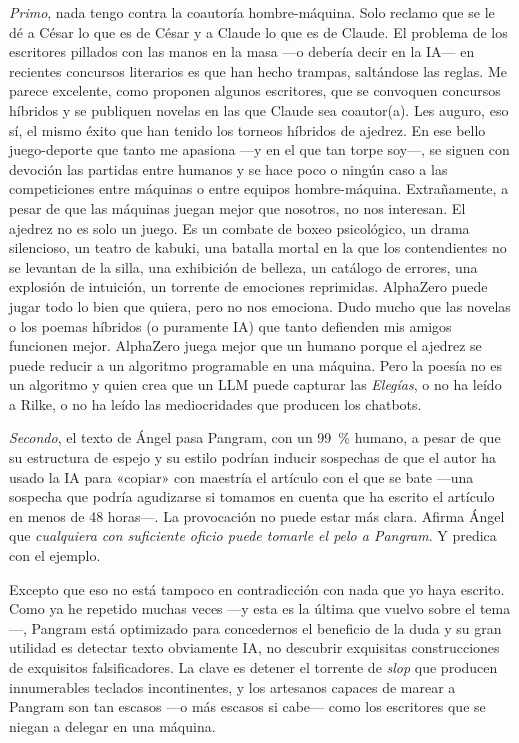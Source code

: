 \documentclass[11pt,a4paper]{article}
\begin{document}
\emph{Primo}, nada tengo contra la coautoría hombre-máquina. Solo reclamo que se le dé a César lo que es de César y a Claude lo que es de Claude. El problema de los escritores pillados con las manos en la masa ---o debería decir en la IA--- en recientes concursos literarios es que han hecho trampas, saltándose las reglas. Me parece excelente, como proponen algunos escritores, que se convoquen concursos híbridos y se publiquen novelas en las que Claude sea coautor(a). Les auguro, eso sí, el mismo éxito que han tenido los torneos híbridos de ajedrez. En ese bello juego-deporte que tanto me apasiona ---y en el que tan torpe soy---, se siguen con devoción las partidas entre humanos y se hace poco o ningún caso a las competiciones entre máquinas o entre equipos hombre-máquina. Extrañamente, a pesar de que las máquinas juegan mejor que nosotros, no nos interesan. El ajedrez no es solo un juego. Es un combate de boxeo psicológico, un drama silencioso, un teatro de kabuki, una batalla mortal en la que los contendientes no se levantan de la silla, una exhibición de belleza, un catálogo de errores, una explosión de intuición, un torrente de emociones reprimidas. AlphaZero puede jugar todo lo bien que quiera, pero no nos emociona. Dudo mucho que las novelas o los poemas híbridos (o puramente IA) que tanto defienden mis amigos funcionen mejor. AlphaZero juega mejor que un humano porque el ajedrez se puede reducir a un algoritmo programable en una máquina. Pero la poesía no es un algoritmo y quien crea que un LLM puede capturar las \emph{Elegías}, o no ha leído a Rilke, o no ha leído las mediocridades que producen los chatbots.

\emph{Secondo}, el texto de Ángel pasa Pangram, con un 99~\% humano, a pesar de que su estructura de espejo y su estilo podrían inducir sospechas de que el autor ha usado la IA para «copiar» con maestría el artículo con el que se bate ---una sospecha que podría agudizarse si tomamos en cuenta que ha escrito el artículo en menos de 48 horas---. La provocación no puede estar más clara. Afirma Ángel que \emph{cualquiera con suficiente oficio puede tomarle el pelo a Pangram}. Y predica con el ejemplo.

Excepto que eso no está tampoco en contradicción con nada que yo haya escrito. Como ya he repetido muchas veces ---y esta es la última que vuelvo sobre el tema---, Pangram está optimizado para concedernos el beneficio de la duda y su gran utilidad es detectar texto obviamente IA, no descubrir exquisitas construcciones de exquisitos falsificadores. La clave es detener el torrente de \emph{slop} que producen innumerables teclados incontinentes, y los artesanos capaces de marear a Pangram son tan escasos ---o más escasos si cabe--- como los escritores que se niegan a delegar en una máquina.
\end{document}
